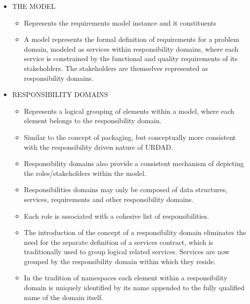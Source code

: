 \begin{itemize}
\begin{itemize}
\begin{itemize}
				\item THE MODEL
					\begin{itemize}
						\item Represents the requirements model instance and it constituents
						\item A model represents the formal definition of requirements for a problem domain, modeled as services within responsibility domains, where each service is constrained by the functional and quality requirements of its stakeholders. The stakeholders are themselves represented as responsibility domains.
					\end{itemize}
					
				\item RESPONSIBILITY DOMAINS
					\begin{itemize}
						\item Represents a logical grouping of elements within a model, where each element belongs to the responsibility domain.
						\item Similar to the concept of packaging, but conceptually more consistent with the responsibility driven nature of URDAD.
						\item Responsibility domains also provide a consistent mechanism of depicting the roles/stakeholders within the model.
						\item Responsibilities domains may only be composed of data structures, services, requirements and other responsibility domains.
						\item Each role is associated with a cohesive list of responsibilities.
						\item The introduction of the concept of a responsibility domain eliminates the need for the separate definition of a services contract, which is traditionally used to group logical related services. Services are now grouped by the responsibility domain within which they reside.
						\item In the tradition of namespaces each element within a responsibility domain is uniquely identified by its name appended to the fully qualified name of the domain itself.
					\end{itemize}
					
					
					

\end{itemize}
\end{itemize}
\end{itemize}
